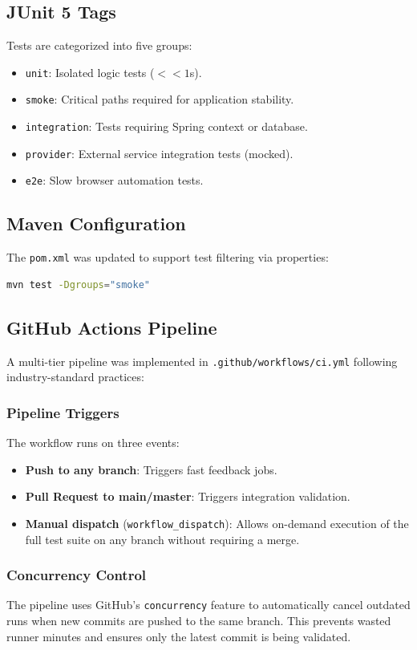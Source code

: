 \documentclass[11pt]{article}
\begin{document}
  \subsection{JUnit 5 Tags}
  Tests are categorized into five groups:
  \begin{itemize}
    \item \texttt{unit}: Isolated logic tests ($<< 1$s).
    \item \texttt{smoke}: Critical paths required for application stability.
    \item \texttt{integration}: Tests requiring Spring context or database.
    \item \texttt{provider}: External service integration tests (mocked).
    \item \texttt{e2e}: Slow browser automation tests.
  \end{itemize}

  \subsection{Maven Configuration}
  The \texttt{pom.xml} was updated to support test filtering via properties:
  \begin{lstlisting}[language=bash]
mvn test -Dgroups="smoke"
  \end{lstlisting}

  \subsection{GitHub Actions Pipeline}
  A multi-tier pipeline was implemented in \texttt{.github/workflows/ci.yml} following industry-standard practices:

  \subsubsection{Pipeline Triggers}
  The workflow runs on three events:
  \begin{itemize}
    \item \textbf{Push to any branch}: Triggers fast feedback jobs.
    \item \textbf{Pull Request to main/master}: Triggers integration validation.
    \item \textbf{Manual dispatch} (\texttt{workflow\_dispatch}): Allows on-demand execution of the full test suite on any branch without requiring a merge.
  \end{itemize}

  \subsubsection{Concurrency Control}
  The pipeline uses GitHub's \texttt{concurrency} feature to automatically cancel outdated runs when new commits are pushed to the same branch. This prevents wasted runner minutes and ensures only the latest commit is being validated.
\end{document}

